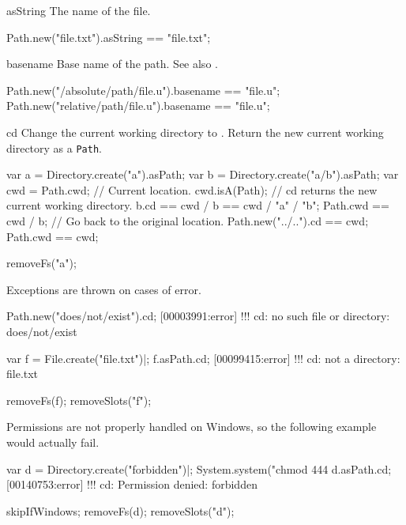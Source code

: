 \begin{urbiscriptapi}
\item[asString]
  The name of the file.
\begin{urbiassert}
Path.new("file.txt").asString == "file.txt";
\end{urbiassert}


\item[basename]%
  Base name of the path.  See also .
\begin{urbiassert}
Path.new("/absolute/path/file.u").basename == "file.u";
Path.new("relative/path/file.u").basename  == "file.u";
\end{urbiassert}


\item[cd]%
  Change the current working directory to \this. Return the new current
  working directory as a \lstinline|Path|.
\begin{urbiassert}
var a = Directory.create("a").asPath;
var b = Directory.create("a/b").asPath;
var cwd = Path.cwd;     // Current location.
cwd.isA(Path);
// cd returns the new current working directory.
b.cd == cwd / b == cwd / "a" / "b";
Path.cwd == cwd / b;
// Go back to the original location.
Path.new("../..").cd == cwd;
Path.cwd == cwd;
\end{urbiassert}
\begin{urbicomment}
removeFs("a");
\end{urbicomment}

Exceptions are thrown on cases of error.
\begin{urbiscript}
Path.new("does/not/exist").cd;
[00003991:error] !!! cd: no such file or directory: does/not/exist

var f = File.create("file.txt")|;
f.asPath.cd;
[00099415:error] !!! cd: not a directory: file.txt
\end{urbiscript}
\begin{urbicomment}
removeFs(f);
removeSlots("f");
\end{urbicomment}

Permissions are not properly handled on Windows, so the following example
would actually fail.
\begin{urbiscript}[firstnumber=1]
var d = Directory.create("forbidden")|;
System.system("chmod 444 %
d.asPath.cd;
[00140753:error] !!! cd: Permission denied: forbidden
\end{urbiscript}
\begin{urbicomment}
skipIfWindows;
removeFs(d);
removeSlots("d");
\end{urbicomment}


\end{urbiscriptapi}
